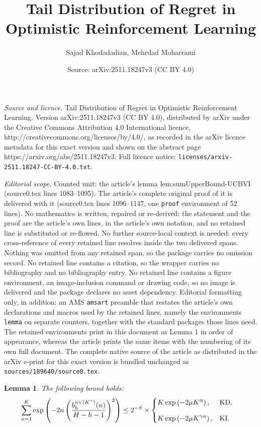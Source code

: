 \documentclass[10pt,a4paper]{amsart}
\title{Tail Distribution of Regret in Optimistic Reinforcement Learning}
\author{Sajad Khodadadian, Mehrdad Moharrami}
\date{Source: arXiv:2511.18247v3 (CC BY 4.0)}
\newtheorem{lemma}{Lemma}
\newcommand{\KD} {\texttt{KD}}
\newcommand{\KI} {\texttt{KI}}
\begin{document}
\maketitle

\noindent\emph{Source and licence.} Tail Distribution of Regret in Optimistic Reinforcement Learning. Version arXiv:2511.18247v3 (CC BY 4.0), distributed by arXiv under the Creative Commons Attribution 4.0 International licence, http://creativecommons.org/licenses/by/4.0/, as recorded in the arXiv licence metadata for this exact version and shown on the abstract page https://arxiv.org/abs/2511.18247v3. Full licence notice: \texttt{licenses/arxiv-2511.18247-CC-BY-4.0.txt}.\par\smallskip

\noindent\textit{Editorial scope.} Counted unit: the article's lemma lem:sumUpperBound-UCBVI (source0.tex lines 1083--1095). The article's complete original proof of it is delivered with it (source0.tex lines 1096--1147, one \texttt{proof} environment of 52 lines). No mathematics is written, repaired or re-derived: the statement and the proof are the article's own lines, in the article's own notation, and no retained line is substituted or re-flowed.  No further source-local context is needed: every cross-reference of every retained line resolves inside the two delivered spans.  Nothing was omitted from any retained span, so the package carries no omission record.  No retained line contains a citation, so the wrapper carries no bibliography and no bibliography entry.  No retained line contains a figure environment, an image-inclusion command or drawing code, so no image is delivered and the package declares no asset dependency.  Editorial formatting only, in addition: an AMS \texttt{amsart} preamble that restates the article's own declarations and macros used by the retained lines, namely the environments \texttt{lemma} on separate counters, together with the standard packages those lines need.  The retained environments print in this document as Lemma 1 in order of appearance, whereas the article prints the same items with the numbering of its own full document.  The complete native source of the article as distributed in the arXiv e-print for this exact version is bundled unchanged as \texttt{sources/189640/source0.tex}.
\begin{lemma}\label{lem:sumUpperBound-UCBVI}
The following bound holds:
\begin{align*}
    \sum_{n=1}^K 
        &\exp\left(-  2n  \left(\frac{b_h^{n \vee \lceil K^\gamma\rceil}(n)}{H-h-1} \right)^2\right) \leq 2^{-S}\times
    \begin{cases}
        \displaystyle K \exp\left(-2\mu { K^{\alpha}}\right),
        & \text{\KD}, \\[2ex]
        \displaystyle K \exp\left(-2\mu  K^{\gamma\alpha}\right),
        & \text{\KI}.
    \end{cases}
\end{align*}
\end{lemma}
\end{document}
